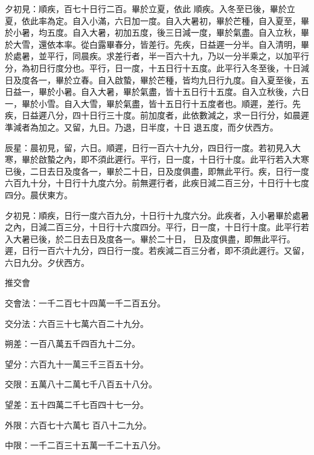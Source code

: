 \begin{pinyinscope}
 夕初見：順疾，百七十日行二百。畢於立夏，依此
 順疾。入冬至已後，畢於立夏，依此率為定。自入小滿，六日加一度。自入大暑初，畢於芒種，自入夏至，畢於小暑，均五度。自入大暑，初加五度，後三日減一度，畢於氣盡。自入立秋，畢於大雪，還依本率。從白露畢春分，皆差行。先疾，日益遲一分半。自入清明，畢於處暑，並平行，同晨疾。求差行者，半一百六十九，乃以一分半乘之，以加平行分，為初日行度分也。平行，日一度，十五日行十五度。此平行入冬至後，十日減日及度各一，畢於立春。自入啟蟄，畢於芒種，皆均九日行九度。自入夏至後，五日益一，畢於小暑。自入大暑，畢於氣盡，皆十五日行十五度。自入立秋後，六日一，畢於小雪。自入大雪，畢於氣盡，皆十五日行十五度者也。順遲，差行。先疾，日益遲八分，四十日行三十度。前加度者，此依數減之，求一日行分，如晨遲準減者為加之。又留，九日。乃退，日半度，十日
 退五度，而夕伏西方。



 辰星：晨初見，留，六日。順遲，日行一百六十九分，四日行一度。若初見入大寒，畢於啟蟄之內，即不須此遲行。平行，日一度，十日行十度。此平行若入大寒已後，二日去日及度各一，畢於二十日，日及度俱盡，即無此平行。疾，日行一度六百九十分，十日行十九度六分。前無遲行者，此疾日減二百三分，十日行十七度四分。晨伏東方。



 夕初見：順疾，日行一度六百九分，十日行十九度六分。此疾者，入小暑畢於處暑之內，日減二百三分，十日行十六度四分。平行，日一度，十日行十度。此平行若入大暑已後，於二日去日及度各一。畢於二十日，
 日及度俱盡，即無此平行。遲，日行一百六十九分，四日行一度。若疾減二百三分者，即不須此遲行。又留，六日九分。夕伏西方。



 推交會



 交會法：一千二百七十四萬一千二百五分。



 交分法：六百三十七萬六百二十九分。



 朔差：一百八萬五千四百九十二分。



 望分：六百九十一萬三千三百五十分。



 交限：五萬八十二萬七千八百五十八分。



 望差：五十四萬二千七百四十七一分。



 外限：六百七十六萬七
 百八十二九分。



 中限：一千二百三十五萬一千二十五八分。




\end{pinyinscope}
